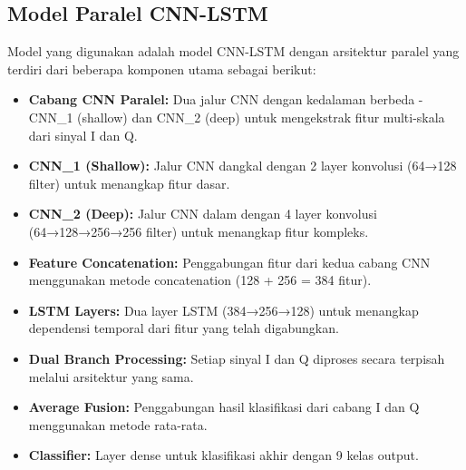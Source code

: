 \documentclass{article}
\begin{document}
\newpage 
\subsection{Model Paralel CNN-LSTM}
Model yang digunakan adalah model CNN-LSTM dengan arsitektur paralel yang terdiri dari beberapa komponen utama sebagai berikut:

\begin{itemize}
    \item \textbf{Cabang CNN Paralel:} Dua jalur CNN dengan kedalaman berbeda - CNN\_1 (shallow) dan CNN\_2 (deep) untuk mengekstrak fitur multi-skala dari sinyal I dan Q.
    \item \textbf{CNN\_1 (Shallow):} Jalur CNN dangkal dengan 2 layer konvolusi (64→128 filter) untuk menangkap fitur dasar.
    \item \textbf{CNN\_2 (Deep):} Jalur CNN dalam dengan 4 layer konvolusi (64→128→256→256 filter) untuk menangkap fitur kompleks.
    \item \textbf{Feature Concatenation:} Penggabungan fitur dari kedua cabang CNN menggunakan metode concatenation (128 + 256 = 384 fitur).
    \item \textbf{LSTM Layers:} Dua layer LSTM (384→256→128) untuk menangkap dependensi temporal dari fitur yang telah digabungkan.
    \item \textbf{Dual Branch Processing:} Setiap sinyal I dan Q diproses secara terpisah melalui arsitektur yang sama.
    \item \textbf{Average Fusion:} Penggabungan hasil klasifikasi dari cabang I dan Q menggunakan metode rata-rata.
    \item \textbf{Classifier:} Layer dense untuk klasifikasi akhir dengan 9 kelas output.
\end{itemize}
\end{document}
